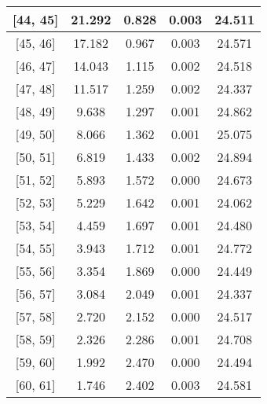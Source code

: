 \documentclass[12pt]{article}
\begin{document}
\begin{table}[]
\begin{tabular}{c|c|c|c|c|}
\multicolumn{1}{|c|}{{[}44,  45{]}}  & 21.292 & 0.828 & 0.003 & 24.511 \\ \hline 
\multicolumn{1}{|c|}{{[}45,  46{]}}  & 17.182 & 0.967 & 0.003 & 24.571 \\ \hline 
\multicolumn{1}{|c|}{{[}46,  47{]}}  & 14.043 & 1.115 & 0.002 & 24.518 \\ \hline 
\multicolumn{1}{|c|}{{[}47,  48{]}}  & 11.517 & 1.259 & 0.002 & 24.337 \\ \hline 
\multicolumn{1}{|c|}{{[}48,  49{]}}  & 9.638 & 1.297 & 0.001 & 24.862 \\ \hline 
\multicolumn{1}{|c|}{{[}49,  50{]}}  & 8.066 & 1.362 & 0.001 & 25.075 \\ \hline 
\multicolumn{1}{|c|}{{[}50,  51{]}}  & 6.819 & 1.433 & 0.002 & 24.894 \\ \hline 
\multicolumn{1}{|c|}{{[}51,  52{]}}  & 5.893 & 1.572 & 0.000 & 24.673 \\ \hline 
\multicolumn{1}{|c|}{{[}52,  53{]}}  & 5.229 & 1.642 & 0.001 & 24.062 \\ \hline 
\multicolumn{1}{|c|}{{[}53,  54{]}}  & 4.459 & 1.697 & 0.001 & 24.480 \\ \hline 
\multicolumn{1}{|c|}{{[}54,  55{]}}  & 3.943 & 1.712 & 0.001 & 24.772 \\ \hline 
\multicolumn{1}{|c|}{{[}55,  56{]}}  & 3.354 & 1.869 & 0.000 & 24.449 \\ \hline 
\multicolumn{1}{|c|}{{[}56,  57{]}}  & 3.084 & 2.049 & 0.001 & 24.337 \\ \hline 
\multicolumn{1}{|c|}{{[}57,  58{]}}  & 2.720 & 2.152 & 0.000 & 24.517 \\ \hline 
\multicolumn{1}{|c|}{{[}58,  59{]}}  & 2.326 & 2.286 & 0.001 & 24.708 \\ \hline 
\multicolumn{1}{|c|}{{[}59,  60{]}}  & 1.992 & 2.470 & 0.000 & 24.494 \\ \hline 
\multicolumn{1}{|c|}{{[}60,  61{]}}  & 1.746 & 2.402 & 0.003 & 24.581 \\ \hline 
\end{tabular}
\end{table}
\end{document}
